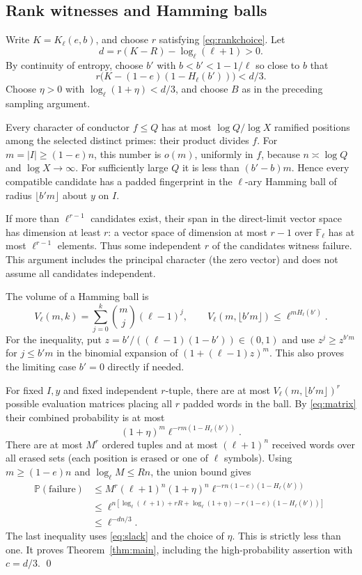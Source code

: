 \documentclass[11pt]{article}
\theoremstyle{remark}\newtheorem{remark}[theorem]{Remark}
\newcommand{\F}{\mathbb F}
\newcommand{\Pp}{\mathbb P}
\begin{document}
\subsection{Rank witnesses and Hamming balls}
Write $K=K_\ell(e,b)$, and choose $r$ satisfying \eqref{eq:rankchoice}. Let
\[
 d=r(K-R)-\log_\ell(\ell+1)>0.
\]
By continuity of entropy, choose $b'$ with $b<b'<1-1/\ell$ so close to $b$ that
\begin{equation}\label{eq:slack}
 r\bigl(K-(1-e)(1-H_\ell(b'))\bigr)<d/3.
\end{equation}
Choose $\eta>0$ with $\log_\ell(1+\eta)<d/3$, and choose $B$ as in the preceding sampling argument.

Every character of conductor $f\le Q$ has at most $\log Q/\log X$ ramified positions among the selected distinct primes: their product divides $f$. For $m=|I|\ge(1-e)n$, this number is $o(m)$, uniformly in $f$, because $n\asymp\log Q$ and $\log X\to\infty$. For sufficiently large $Q$ it is less than $(b'-b)m$. Hence every compatible candidate has a padded fingerprint in the $\ell$-ary Hamming ball of radius $\lfloor b'm\rfloor$ about $y$ on $I$.

If more than $\ell^{r-1}$ candidates exist, their span in the direct-limit vector space has dimension at least $r$: a vector space of dimension at most $r-1$ over $\F_\ell$ has at most $\ell^{r-1}$ elements. Thus some independent $r$ of the candidates witness failure. This argument includes the principal character (the zero vector) and does not assume all candidates independent.

The volume of a Hamming ball is
\[
 V_\ell(m,k)=\sum_{j=0}^k\binom mj(\ell-1)^j,
\qquad
 V_\ell(m,\lfloor b'm\rfloor)\le\ell^{mH_\ell(b')}.
\]
For the inequality, put $z=b'/((\ell-1)(1-b'))\in(0,1)$ and use $z^j\ge z^{b'm}$ for $j\le b'm$ in the binomial expansion of $(1+(\ell-1)z)^m$. This also proves the limiting case $b'=0$ directly if needed.

For fixed $I,y$ and fixed independent $r$-tuple, there are at most $V_\ell(m,\lfloor b'm\rfloor)^r$ possible evaluation matrices placing all $r$ padded words in the ball. By \eqref{eq:matrix} their combined probability is at most
\[
 (1+\eta)^m\ell^{-rm(1-H_\ell(b'))}.
\]
There are at most $M^r$ ordered tuples and at most $(\ell+1)^n$ received words over all erased sets (each position is erased or one of $\ell$ symbols). Using $m\ge(1-e)n$ and $\log_\ell M\le Rn$, the union bound gives
\begin{align*}
 \Pp(\text{failure})
 &\le M^r(\ell+1)^n(1+\eta)^n
   \ell^{-rn(1-e)(1-H_\ell(b'))}\\
 &\le \ell^{n[\log_\ell(\ell+1)+rR+\log_\ell(1+\eta)-r(1-e)(1-H_\ell(b'))]}\\
 &\le \ell^{-dn/3}.
\end{align*}
The last inequality uses \eqref{eq:slack} and the choice of $\eta$. This is strictly less than one. It proves Theorem~\ref{thm:main}, including the high-probability assertion with $c=d/3$. \qed
\end{document}
